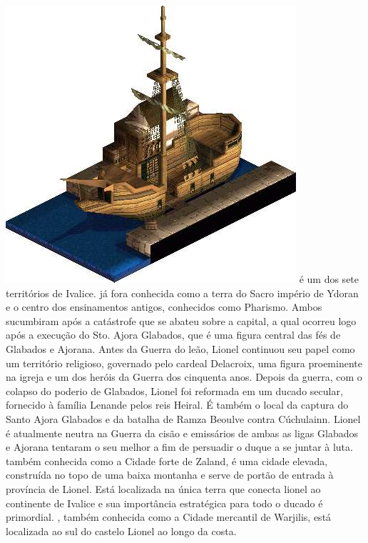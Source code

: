 \includegraphics[width=\columnwidth]{./art/worldbook/warjilis.jpg}
\ofpar
%
 é um dos sete territórios de Ivalice. já fora conhecida como a terra do Sacro império de Ydoran e o centro dos ensinamentos antigos, conhecidos como Pharismo.
Ambos sucumbiram após a catástrofe que se abateu sobre a capital, a qual ocorreu logo após a execução do Sto. Ajora Glabados, que é uma figura central das fés de Glabados e Ajorana.
Antes da Guerra do leão, Lionel continuou seu papel como um território religioso, governado pelo cardeal Delacroix, uma figura proeminente na igreja e um dos heróis da Guerra dos cinquenta anos.
Depois da guerra, com o colapso do poderio de Glabados, Lionel foi reformada em um ducado secular, fornecido à família Lenande pelos reis Heiral.
É também o local da captura do Santo Ajora Glabados e da batalha de Ramza Beoulve contra Cúchulainn.
Lionel é atualmente neutra na Guerra da cisão e emissários de ambas as ligas Glabados e Ajorana tentaram o seu melhor a fim de persuadir o duque a se juntar à luta.
 também conhecida como a Cidade forte de Zaland, é uma cidade elevada, construída no topo de uma baixa montanha e serve de portão de entrada à província de Lionel.
Está localizada na única terra que conecta lionel ao continente de Ivalice e sua importância estratégica para todo o ducado é primordial.
, também conhecida como a Cidade mercantil de Warjilis, está localizada ao sul do castelo Lionel ao longo da costa.
